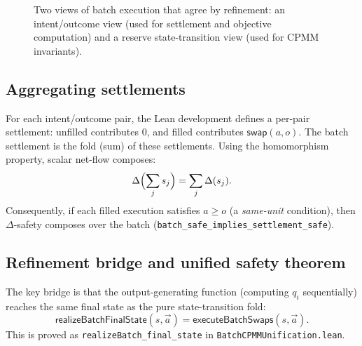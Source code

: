 \documentclass[11pt]{article}
\theoremstyle{remark}
\begin{document}
\begin{figure}[t]
\centering
{}
\caption{Two views of batch execution that agree by refinement: an intent/outcome view (used
for settlement and objective computation) and a reserve state-transition view (used for CPMM
invariants).}
\label{fig:batch-refinement}
\end{figure}

\subsection{Aggregating settlements}

For each intent/outcome pair, the Lean development defines a per-pair settlement:
unfilled contributes $0$, and filled contributes $\mathsf{swap}(a,o)$.
The batch settlement is the fold (sum) of these settlements.
Using the homomorphism property, scalar net-flow composes:
\[
  \Delta\Bigl(\sum_j s_j\Bigr) = \sum_j \Delta(s_j).
\]
Consequently, if each filled execution satisfies $a\ge o$ (a \emph{same-unit} condition),
then $\Delta$-safety composes over the batch (\texttt{batch\_safe\_implies\_settlement\_safe}).

\subsection{Refinement bridge and unified safety theorem}

The key bridge is that the output-generating function (computing $q_i$ sequentially)
reaches the same final state as the pure state-transition fold:
\[
  \mathsf{realizeBatchFinalState}(s,\vec a) = \mathsf{executeBatchSwaps}(s,\vec a).
\]
This is proved as \texttt{realizeBatch\_final\_state} in \texttt{BatchCPMMUnification.lean}.
\end{document}
